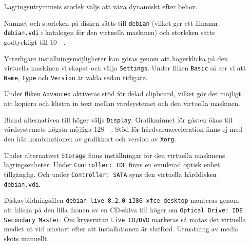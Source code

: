            {}
           {Lagringsutrymmets storlek väljs att växa dynamiskt efter behov.}
           {}

           {}
           {Namnet och storleken på disken sätts till \texttt{debian} (vilket
            ger ett filnamn \texttt{debian.vdi} i katalogen för den virtuella
            maskinen) och storleken sätts godtyckligt till \SI{10}{\mega\byte}.}
           {}

           {}
           {Ytterligare inställningsmöjligheter kan göras genom att högerklicka
            på den virtuella maskinen vi skapat och välja \texttt{Settings}.
            Under fliken \texttt{Basic} så ser vi att \texttt{Name}, \texttt{Type}
            och \texttt{Version} är valda sedan tidigare.}
           {}

           {}
           {Under fliken \texttt{Advanced} aktiveras stöd för delad clipboard,
            vilket gör det möjligt att kopiera och klistra in text mellan
            värdsystemet och den virtuella maskinen.}
           {}

           {}
           {Bland alternativen till höger väljs \texttt{Display}.
            Grafikminnet för gästen ökas till värdsystemets högsta möjliga
            \SI{128}{\mega\byte}. Stöd för hårdvaruacceleration finns ej med
            den här kombinationen av grafikkort och version av \texttt{Xorg}.}
           {}

           {}
           {Under alternativet \texttt{Storage} finns inställningar för den
            virtuella maskinens lagringsenheter. Under \texttt{Controller: IDE}
            finns en emulerad optisk enhet tillgänglig.
            Och under \texttt{Controller: SATA} syns den virtuella hårddisken
            \texttt{debian.vdi}.}
           {}

           {}
           {Diskavbildningsfilen \texttt{debian-live-8.2.0-i386-xfce-desktop} monteras
            genom att klicka på den lilla ikonen av en CD-skiva till höger om
            \texttt{Optical Drive: IDE Secondary Master}. Om kryssrutan
            \texttt{Live CD/DVD} markeras så matas det virtuella mediet ut vid omstart
            efter att installationen är slutförd. Utmatning av media sköts manuellt.}
           {}

           {}
           {}
           {}

